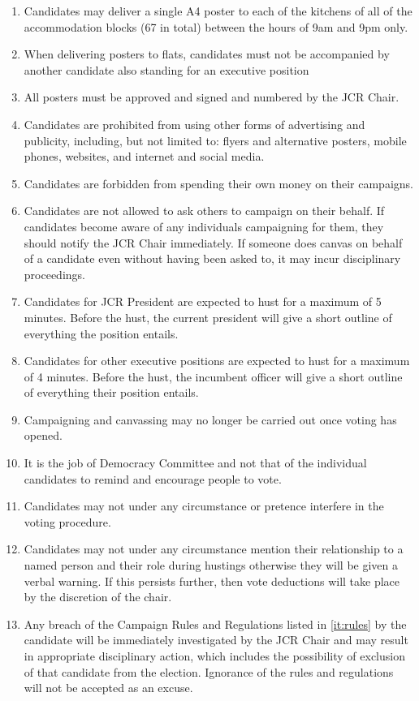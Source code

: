 \begin{enumerate}
\begin{enumerate}
\begin{enumerate}
        \end{enumerate}
        \item Candidates may deliver a single A4 poster to each of the kitchens of all of the accommodation blocks (67 in total) between the hours of 9am and 9pm only. 
        \item When delivering posters to flats, candidates must not be accompanied by another candidate also standing for an executive position
        \item All posters must be approved and signed and numbered by the JCR Chair.
        \item Candidates are prohibited from using other forms of advertising and publicity, including, but
        not limited to: flyers and alternative posters, mobile phones, websites, and internet and social media.
        \item Candidates are forbidden from spending their own money on their campaigns.
        \item Candidates are not allowed to ask others to campaign on their behalf. If candidates become aware of any individuals campaigning for them, they should notify the JCR Chair immediately. If someone does canvas on behalf of a candidate even without having been asked to, it may incur disciplinary proceedings.
        \item Candidates for JCR President are expected to hust for a maximum of 5 minutes. Before the hust, the current president will give a short outline of everything the position entails.
        \item Candidates for other executive positions are expected to hust for a maximum of 4 minutes. Before the hust, the incumbent officer will give a short outline of everything their position entails.
        \item Campaigning and canvassing may no longer be carried out once voting has opened.
        \item It is the job of Democracy Committee and not that of the individual candidates to remind and encourage people to vote.
        \item Candidates may not under any circumstance or pretence interfere in the voting procedure.
        \item Candidates may not under any circumstance mention their relationship to a named person and their role during hustings otherwise they will be given a verbal warning. If this persists further, then vote deductions will take place by the discretion of the chair.
        \item Any breach of the Campaign Rules and Regulations listed in \ref{it:rules} by the candidate will be immediately investigated by the JCR Chair and may result in appropriate disciplinary action, which includes the possibility of exclusion of that candidate from the election. Ignorance of the rules and regulations will not be accepted as an excuse.

\end{enumerate}
\end{enumerate}
